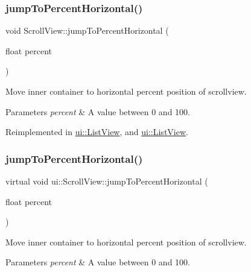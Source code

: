 \subsubsection{\texorpdfstring{jump\+To\+Percent\+Horizontal()}{jumpToPercentHorizontal()}\hspace{0.1cm}{\footnotesize\ttfamily [1/2]}}
{\footnotesize\ttfamily void Scroll\+View\+::jump\+To\+Percent\+Horizontal (\begin{DoxyParamCaption}\item[{float}]{percent }\end{DoxyParamCaption})\hspace{0.3cm}{\ttfamily [virtual]}}

Move inner container to horizontal percent position of scrollview. 
\begin{DoxyParams}{Parameters}
{\em percent} & A value between 0 and 100. \\
\hline
\end{DoxyParams}


Reimplemented in \hyperlink{classui_1_1ListView_a783891312300a50f3b05ff15ea3f5b19}{ui\+::\+List\+View}, and \hyperlink{classui_1_1ListView_a770ffffaa274cc0bd86828910586632d}{ui\+::\+List\+View}.

\mbox{\label{classui_1_1ScrollView_a3cddd274e2fcbce1489608b7c581a14d}} 
\subsubsection{\texorpdfstring{jump\+To\+Percent\+Horizontal()}{jumpToPercentHorizontal()}\hspace{0.1cm}{\footnotesize\ttfamily [2/2]}}
{\footnotesize\ttfamily virtual void ui\+::\+Scroll\+View\+::jump\+To\+Percent\+Horizontal (\begin{DoxyParamCaption}\item[{float}]{percent }\end{DoxyParamCaption})\hspace{0.3cm}{\ttfamily [virtual]}}

Move inner container to horizontal percent position of scrollview. 
\begin{DoxyParams}{Parameters}
{\em percent} & A value between 0 and 100. \\
\hline
\end{DoxyParams}


